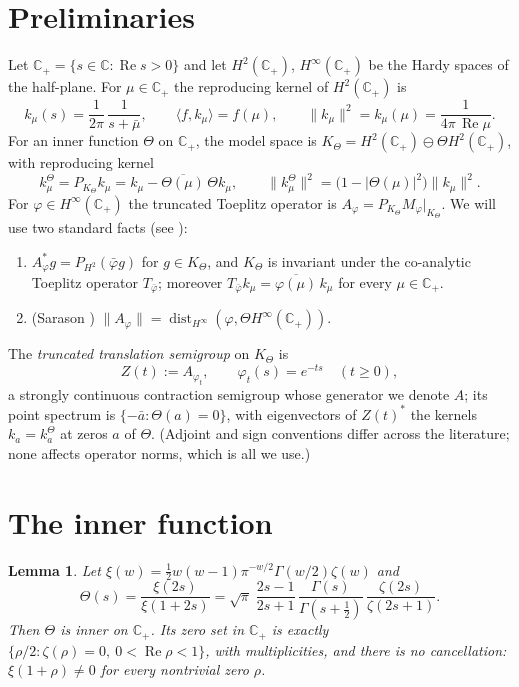 \documentclass[11pt]{amsart}
\newtheorem{lemma}[theorem]{Lemma}
\theoremstyle{remark}
\newcommand{\Cp}{\mathbb{C}_{+}}
\newcommand{\HH}{H^{2}(\Cp)}
\newcommand{\Hinf}{H^{\infty}(\Cp)}
\newcommand{\KT}{K_{\Theta}}
\newcommand{\dist}{\operatorname{dist}}
\newcommand{\re}{\operatorname{Re}}
\begin{document}
\section{Preliminaries}

Let $\Cp=\{s\in\mathbb C:\re s>0\}$ and let $\HH$, $\Hinf$ be the Hardy
spaces of the half-plane. For $\mu\in\Cp$ the reproducing kernel of
$\HH$ is
\[
  k_{\mu}(s)=\frac{1}{2\pi}\,\frac{1}{s+\bar\mu},
  \qquad
  \langle f,k_{\mu}\rangle=f(\mu),
  \qquad
  \|k_{\mu}\|^{2}=k_{\mu}(\mu)=\frac{1}{4\pi\,\re\mu}.
\]
For an inner function $\Theta$ on $\Cp$, the model space is
$\KT=\HH\ominus\Theta\HH$, with reproducing kernel
\[
  k^{\Theta}_{\mu}
  = P_{\KT}k_{\mu}
  = k_{\mu}-\overline{\Theta(\mu)}\,\Theta k_{\mu},
  \qquad
  \|k^{\Theta}_{\mu}\|^{2}
  = \bigl(1-|\Theta(\mu)|^{2}\bigr)\|k_{\mu}\|^{2}.
\]
For $\varphi\in\Hinf$ the truncated Toeplitz operator is
$A_{\varphi}=P_{\KT}M_{\varphi}|_{\KT}$. We will use two standard facts
(see \cite{GMR, Sarason}):
\begin{enumerate}
\item[(i)] $A_{\varphi}^{*}g = P_{H^{2}}(\bar\varphi g)$ for
  $g\in\KT$, and $K_{\Theta}$ is invariant under the co-analytic
  Toeplitz operator $T_{\bar\varphi}$; moreover
  $T_{\bar\varphi}k_{\mu}=\overline{\varphi(\mu)}\,k_{\mu}$ for every
  $\mu\in\Cp$.
\item[(ii)] (Sarason \cite{Sarason})
  $\|A_{\varphi}\|=\dist_{H^{\infty}}(\varphi,\Theta\Hinf)$.
\end{enumerate}
The \emph{truncated translation semigroup} on $\KT$ is
\[
  Z(t) := A_{\varphi_{t}},
  \qquad
  \varphi_{t}(s)=e^{-ts}
  \quad (t\ge 0),
\]
a strongly continuous contraction semigroup whose generator we denote
$A$; its point spectrum is $\{-\bar a:\Theta(a)=0\}$, with eigenvectors
of $Z(t)^{*}$ the kernels $k_{a}=k^{\Theta}_{a}$ at zeros $a$ of
$\Theta$. (Adjoint and sign conventions differ across the literature;
none affects operator norms, which is all we use.)

\section{The inner function}

\begin{lemma}\label{lem:inner}
Let $\xi(w)=\tfrac12 w(w-1)\pi^{-w/2}\Gamma(w/2)\zeta(w)$ and
\[
  \Theta(s)=\frac{\xi(2s)}{\xi(1+2s)}
  =\sqrt{\pi}\;\frac{2s-1}{2s+1}\,
   \frac{\Gamma(s)}{\Gamma(s+\tfrac12)}\,
   \frac{\zeta(2s)}{\zeta(2s+1)}.
\]
Then $\Theta$ is inner on $\Cp$. Its zero set in $\Cp$ is exactly
$\{\rho/2:\zeta(\rho)=0,\ 0<\re\rho<1\}$, with multiplicities, and there
is no cancellation: $\xi(1+\rho)\neq0$ for every nontrivial zero
$\rho$.
\end{lemma}
\end{document}
